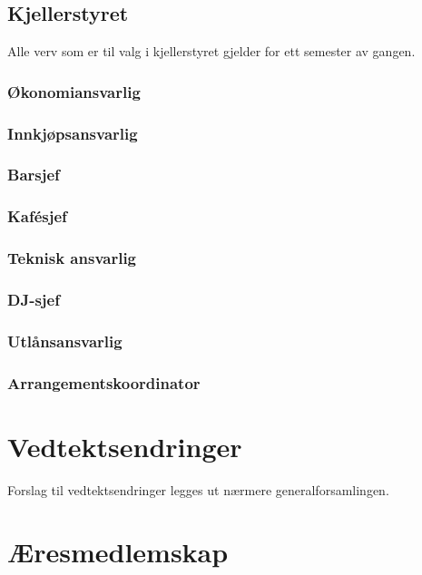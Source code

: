 \documentclass[10pt,norsk,a4paper]{article}
\begin{document}
\begin{minipage}[t]{0.49\textwidth}
\subsection{Kjellerstyret} %
Alle verv som er til valg i kjellerstyret gjelder for ett semester av gangen.

\subsubsection{Økonomiansvarlig}
\subsubsection{Innkjøpsansvarlig}
\subsubsection{Barsjef}
\subsubsection{Kafésjef}
\subsubsection{Teknisk ansvarlig}
\subsubsection{DJ-sjef}
\subsubsection{Utlånsansvarlig}
\subsubsection{Arrangementskoordinator}

\end{minipage}

\newpage

\section{Vedtektsendringer}
Forslag til vedtektsendringer legges ut nærmere generalforsamlingen.

\section{Æresmedlemskap}
\end{document}
